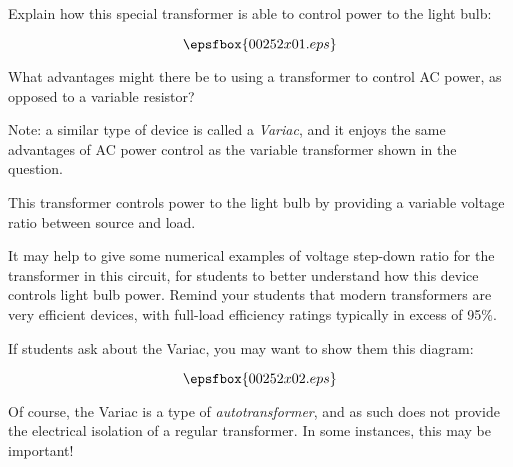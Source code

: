 

Explain how this special transformer is able to control power to the light bulb:

$$\epsfbox{00252x01.eps}$$

What advantages might there be to using a transformer to control AC power, as opposed to a variable resistor?

\vskip 10pt

Note: a similar type of device is called a {\it Variac}, and it enjoys the same advantages of AC power control as the variable transformer shown in the question.







This transformer controls power to the light bulb by providing a variable voltage ratio between source and load.







It may help to give some numerical examples of voltage step-down ratio for the transformer in this circuit, for students to better understand how this device controls light bulb power.  Remind your students that modern transformers are very efficient devices, with full-load efficiency ratings typically in excess of 95\%.

If students ask about the Variac, you may want to show them this diagram:

$$\epsfbox{00252x02.eps}$$

Of course, the Variac is a type of {\it autotransformer}, and as such does not provide the electrical isolation of a regular transformer.  In some instances, this may be important!





